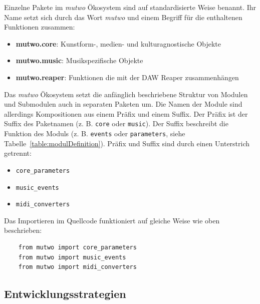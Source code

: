 \documentclass[12pt,a4paper,ngerman]{article}
\begin{document}
Einzelne Pakete im \emph{mutwo} Ökosystem sind auf standardisierte Weise benannt.
Ihr Name setzt sich durch das Wort \emph{mutwo} und einem Begriff für die enthaltenen Funktionen zusammen:

\begin{itemize}
    \item{\textbf{mutwo.core}: Kunstform-, medien- und kulturagnostische Objekte}
    \item{\textbf{mutwo.music}: Musikspezifische Objekte}
    \item{\textbf{mutwo.reaper}: Funktionen die mit der DAW Reaper zusammenhängen}
\end{itemize}

Das \emph{mutwo} Ökosystem setzt die anfänglich beschriebene Struktur von Modulen und Submodulen auch in separaten Paketen um.
Die Namen der Module sind allerdings Kompositionen aus einem Präfix und einem Suffix.
Der Präfix ist der Suffix des Paketnamen (z. B. \texttt{core} oder \texttt{music}).
Der Suffix beschreibt die Funktion des Moduls (z. B. \texttt{events} oder \texttt{parameters}, siehe Tabelle~\ref{table:modulDefinition}).
Präfix und Suffix sind durch einen Unterstrich getrennt:

\begin{itemize}
    \item{\texttt{core\_parameters}}
    \item{\texttt{music\_events}}
    \item{\texttt{midi\_converters}}
\end{itemize}

Das Importieren im Quellcode funktioniert auf gleiche Weise wie oben beschrieben:


\begin{lstlisting}
    from mutwo import core_parameters
    from mutwo import music_events
    from mutwo import midi_converters
\end{lstlisting}


\subsection{Entwicklungsstrategien}
\end{document}
